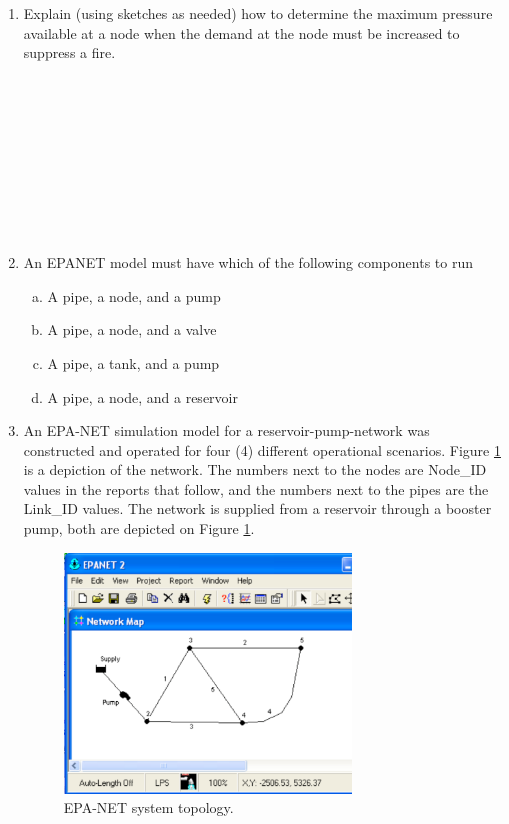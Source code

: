 \documentclass[11pt]{article}
\begin{document}
\begin{enumerate}
\item Explain (using sketches as needed) how to determine the maximum pressure available at a node when the demand at the node must be increased to suppress a fire. \\~\\~\\~\\~\\~\\~\\~\\~\\~\\
\item An EPANET model must have which of the following components to run
\begin{enumerate}[a)]
\item A pipe, a node, and a pump 
\item A pipe, a node, and a valve
\item A pipe, a tank, and a pump
\item A pipe, a node, and a reservoir
\end{enumerate}



\clearpage
\item  An EPA-NET simulation model for a reservoir-pump-network was constructed and operated for four (4) different operational scenarios.   Figure \ref{fig:epa-net-map} is a depiction of the network.   The numbers next to the nodes are Node\_ID values in the reports that follow, and the numbers next to the pipes are the Link\_ID values.  The network is supplied from a reservoir through a booster pump, both are depicted on Figure \ref{fig:epa-net-map}. 

\begin{figure}[h!] %
\centering
   \includegraphics[width=3in]{epa-net-map.pdf}
   \caption{EPA-NET system topology.}
   \label{fig:epa-net-map} 
\end{figure}


\end{enumerate}
\end{document}
